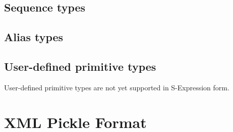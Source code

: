 \subsection{Sequence types}

\subsection{Alias types}

\subsection{User-defined primitive types}
User-defined primitive types are not yet supported in S-Expression form.

\section{XML Pickle Format}

